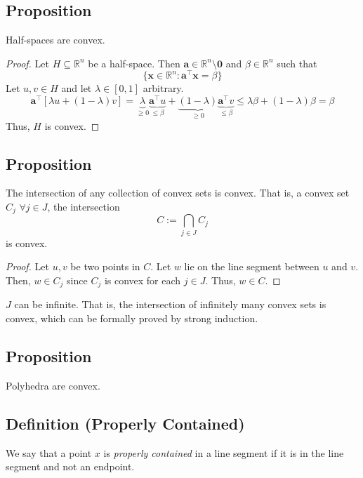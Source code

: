 \begin{thmbox}
    \subsection{Proposition}
    Half-spaces are convex.
\end{thmbox}
\begin{proof}
    Let $ H\subseteq\mathbb{R}^n $ be a half-space. Then $ \bm{a} \in \mathbb{R}
    ^n\setminus{\bm{0}} $ and $ \beta\in\mathbb{R}^n $ such that
    \[ \{\bm{x}\in\mathbb{R}^n:\bm{a} ^\top \bm{x}=\beta\} \]
    Let $ u,v\in H $ and let $ \lambda\in[0,1] $ arbitrary.
    \[ \bm{a} ^\top[\lambda u+(1-\lambda)v]=
    \underbrace{\lambda}_{\ge 0}\underbrace{\bm{a} ^\top u}_{\le \beta}+
    \underbrace{(1-\lambda)}_{\ge 0}\underbrace{\bm{a} ^\top v}_{\le \beta}
    \le \lambda \beta + (1-\lambda)\beta=\beta \]
    Thus, $ H $ is convex.
\end{proof}

\begin{thmbox}
    \subsection{Proposition}
    The intersection of any collection of convex sets is convex. 
    That is, a convex set $ C_j $ $ \forall j\in J $, the intersection
    \[ C:=\bigcap_{j\in J} C_j \]
    is convex.
\end{thmbox}

\begin{proof}
    Let $ u,v $ be two points in $ C $. Let $ w $ lie on the line
    segment between $ u $ and $ v $. Then, $ w\in C_j $ since $ C_j $ is convex
    for each $ j\in J $. Thus, $ w\in C $.
\end{proof}

\begin{remark}
    $ J $ can be infinite. That is, the intersection of infinitely many convex sets
    is convex, which can be formally proved by strong induction.
\end{remark}

\begin{thmbox}
    \subsection{Proposition}
    Polyhedra are convex.
\end{thmbox}

\begin{defbox}
    \subsection{Definition (Properly Contained)}
    We say that a point $x$ is \emph{properly contained} in a line segment if it is in the line segment and not an endpoint.
\end{defbox}

